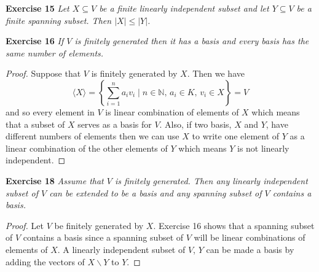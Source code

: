 \documentclass{article}
\begin{document}
\begin{flushleft}
\textbf{Exercise 15}
\textsl{Let $X \subseteq V$ be a finite linearly independent subset and let $Y \subseteq V$ be a finite spanning subset. Then $|X| \leq |Y|$.}

\textbf{Exercise 16}
\textsl{If $V$ is finitely generated then it has a basis and every basis has the same number of elements.}
\begin{proof}
Suppose that $V$ is finitely generated by $X$. Then we have
\[
\langle X \rangle = \left \{ \sum_{i=1}^n a_i v_i \mid \text{$n \in \mathbb{N}$, $a_i \in K$, $v_i \in X$} \right \} = V
\]
and so every element in $V$ is linear combination of elements of $X$ which means that a subset of $X$ serves as a basis for $V$. Also, if two basis, $X$ and $Y$, have different numbers of elements then we can use $X$ to write one element of $Y$ as a linear combination of the other elements of $Y$ which means $Y$ is not linearly independent.
\end{proof}

\textbf{Exercise 18}
\textsl{Assume that $V$ is finitely generated. Then any linearly independent subset of $V$ can be extended to be a basis and any spanning subset of $V$ contains a basis.}
\begin{proof}
Let $V$ be finitely generated by $X$. Exercise 16 shows that a spanning subset of $V$ contains a basis since a spanning subset of $V$ will be linear combinations of elements of $X$. A linearly independent subset of $V$, $Y$ can be made a basis by adding the vectors of $X \backslash Y$ to $Y$.
\end{proof}

\end{flushleft}
\end{document}
